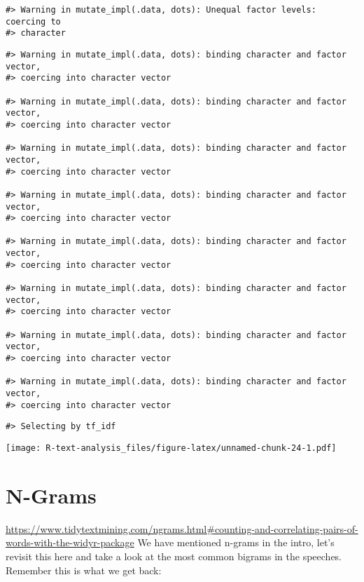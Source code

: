 \documentclass[]{book}
\newenvironment{Shaded}{\begin{snugshade}}{\end{snugshade}}
\newcommand{\CommentTok}[1]{\textcolor[rgb]{0.56,0.35,0.01}{\textit{#1}}}
\newcommand{\DataTypeTok}[1]{\textcolor[rgb]{0.13,0.29,0.53}{#1}}
\newcommand{\DecValTok}[1]{\textcolor[rgb]{0.00,0.00,0.81}{#1}}
\newcommand{\KeywordTok}[1]{\textcolor[rgb]{0.13,0.29,0.53}{\textbf{#1}}}
\newcommand{\NormalTok}[1]{#1}
\newcommand{\OperatorTok}[1]{\textcolor[rgb]{0.81,0.36,0.00}{\textbf{#1}}}
\newcommand{\StringTok}[1]{\textcolor[rgb]{0.31,0.60,0.02}{#1}}
\begin{document}
\begin{verbatim}
#> Warning in mutate_impl(.data, dots): Unequal factor levels: coercing to
#> character
\end{verbatim}

\begin{verbatim}
#> Warning in mutate_impl(.data, dots): binding character and factor vector,
#> coercing into character vector

#> Warning in mutate_impl(.data, dots): binding character and factor vector,
#> coercing into character vector

#> Warning in mutate_impl(.data, dots): binding character and factor vector,
#> coercing into character vector

#> Warning in mutate_impl(.data, dots): binding character and factor vector,
#> coercing into character vector

#> Warning in mutate_impl(.data, dots): binding character and factor vector,
#> coercing into character vector

#> Warning in mutate_impl(.data, dots): binding character and factor vector,
#> coercing into character vector

#> Warning in mutate_impl(.data, dots): binding character and factor vector,
#> coercing into character vector

#> Warning in mutate_impl(.data, dots): binding character and factor vector,
#> coercing into character vector
\end{verbatim}

\begin{verbatim}
#> Selecting by tf_idf
\end{verbatim}

\texttt{[image: R-text-analysis\_files/figure-latex/unnamed-chunk-24-1.pdf]}

\hypertarget{n-grams}{%
\section{N-Grams}\label{n-grams}}

\url{https://www.tidytextmining.com/ngrams.html\#counting-and-correlating-pairs-of-words-with-the-widyr-package}
We have mentioned n-grams in the intro, let's revisit this here and take a look at the most common bigrams in the speeches. Remember this is what we get back:

\begin{Shaded}
\end{Shaded}
\end{document}

